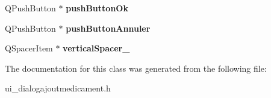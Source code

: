 \begin{DoxyCompactItemize}
\item 
\hypertarget{classUi__DialogAjoutMedicament_a6f5be158b6e0218526b0c0749c2ccbec}{Q\-Push\-Button $\ast$ {\bfseries push\-Button\-Ok}}\label{classUi__DialogAjoutMedicament_a6f5be158b6e0218526b0c0749c2ccbec}

\item 
\hypertarget{classUi__DialogAjoutMedicament_a5c32fe453bbe66e01a7166aafb08d3da}{Q\-Push\-Button $\ast$ {\bfseries push\-Button\-Annuler}}\label{classUi__DialogAjoutMedicament_a5c32fe453bbe66e01a7166aafb08d3da}

\item 
\hypertarget{classUi__DialogAjoutMedicament_a07c44d8021a462833370f816b7587112}{Q\-Spacer\-Item $\ast$ {\bfseries vertical\-Spacer\-\_}}\label{classUi__DialogAjoutMedicament_a07c44d8021a462833370f816b7587112}

\end{DoxyCompactItemize}


The documentation for this class was generated from the following file\-:\begin{DoxyCompactItemize}
\item 
ui\-\_\-dialogajoutmedicament.\-h\end{DoxyCompactItemize}
